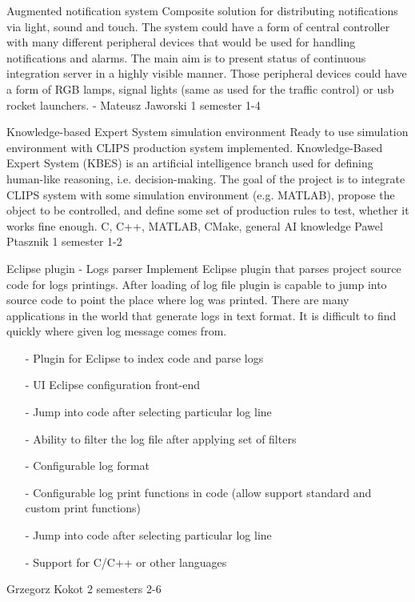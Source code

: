 \begin{project}
{Augmented notification system}
{Composite solution for distributing notifications via light, sound and touch.}
{
The system could have a form of central controller with many different 
peripheral devices that would be used for handling notifications and alarms. 
The main aim is to present status of continuous integration server in a highly visible manner. 
Those peripheral devices could have a form of RGB lamps, signal lights (same as used for the traffic control) or usb rocket launchers.
}
{-}
{Mateusz Jaworski}
{1 semester}
{1-4}
\end{project}
\begin{project}
{Knowledge-based Expert System simulation environment}
{Ready to use simulation environment with CLIPS production system implemented.}
{
Knowledge-Based Expert System (KBES) is an artificial intelligence branch used for defining human-like reasoning, i.e. decision-making. The goal of the project is to integrate CLIPS system with some simulation environment (e.g. MATLAB), propose the object to be controlled, and define some set of production rules to test, whether it works fine enough. }
{C, C++, MATLAB, CMake, general AI knowledge}
{Pawel Ptasznik}
{1 semester}
{1-2}
\end{project}
\begin{project}
{Eclipse plugin - Logs parser}
{
Implement Eclipse plugin that parses project source code for logs printings.
After loading of log file plugin is capable to jump into source code to point
the place where log was printed.
There are many applications in the world that generate logs in text format. It is difficult to find quickly where given log message comes from. 
}
{
 \begin{itemize}
  \item[-] Plugin for Eclipse to index code and parse logs
  \item[-] UI Eclipse configuration front-end
  \item[-] Jump into code after selecting particular log line
  \item[-] Ability to filter the log file after applying set of filters
\end{itemize}
}
{
 \begin{itemize}
  \item[-] Configurable log format
  \item[-] Configurable log print functions in code (allow support standard and custom print functions)
  \item[-] Jump into code after selecting particular log line
  \item[-] Support for C/C++ or other languages
\end{itemize}
}
{Grzegorz Kokot}
{2 semesters}
{2-6}
\end{project}
